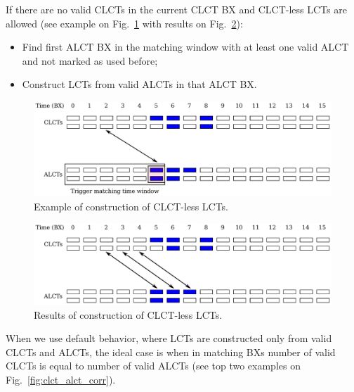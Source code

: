 If there are no valid CLCTs in the current CLCT BX and CLCT-less LCTs are allowed (see example on Fig.~\ref{fig:clct_alcts_clctless} with results on Fig.~\ref{fig:clct_alcts_clctless_end}):
\begin{itemize}
    \item Find first ALCT BX in the matching window with at least one valid ALCT and not marked as used before;
    \item Construct LCTs from valid ALCTs in that ALCT BX.
\end{itemize}

\begin{figure}[tbh]
        \begin{center}
                \includegraphics[width=0.7\linewidth]{figures/clct_alcts_clctless.pdf}
                \caption{Example of construction of CLCT-less LCTs.}
                \label{fig:clct_alcts_clctless}
        \end{center}
\end{figure}

\begin{figure}[tbh]
        \begin{center}
                \includegraphics[width=0.7\linewidth]{figures/clct_alcts_clctless_end.pdf}
                \caption{Results of construction of CLCT-less LCTs.}
                \label{fig:clct_alcts_clctless_end}
        \end{center}
\end{figure}

When we use default behavior, where LCTs are constructed only from valid CLCTs and ALCTs, the ideal case is when in matching BXs number of valid CLCTs is equal to number of valid ALCTs (see top two examples on Fig.~\ref{fig:clct_alct_corr}).


